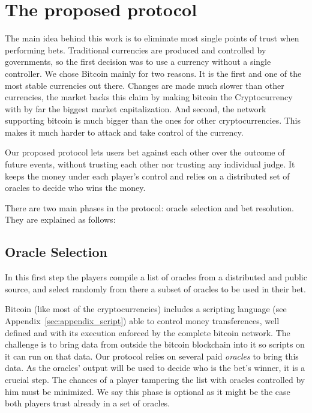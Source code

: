 \section{The proposed protocol}

The main idea behind this work is to eliminate most single points of
  trust when performing bets.
Traditional currencies are produced and controlled by governments, so the first
  decision was to use a currency without a single controller.
We chose Bitcoin mainly for two reasons.
It is the first and one of the most stable currencies out there.
Changes are made much slower than other currencies, the market backs this claim
  by making bitcoin the Cryptocurrency with by far the biggest market
  capitalization.
And second, the network supporting bitcoin is much bigger than the ones for
  other cryptocurrencies. This makes it much harder to attack and take control
  of the currency.

Our proposed protocol lets users bet against each other over the outcome of
  future events, without trusting each other nor trusting any individual judge.
It keeps the money under each player's control and relies on a distributed set
  of oracles to decide who wins the money.

There are two main phases in the protocol: oracle selection and bet
  resolution. They are explained as follows:

\subsection{Oracle Selection}
In this first step the players compile a list of oracles from a distributed
  and public source, and select randomly from there a subset of oracles to
  be used in their bet.

Bitcoin (like most of the cryptocurrencies) includes a scripting language
  (see Appendix~\ref{sec:appendix_script})
able
 to control money transferences, well defined and with its execution enforced by
 the complete bitcoin network.
The challenge is to bring data from outside the bitcoin blockchain into it so
  scripts on it can run on that data.
Our protocol relies on several paid \textit{oracles} to bring this data.
As the oracles' output will be used to decide who is the bet's winner, it is a
  crucial step.
The chances of a player tampering the list with oracles controlled by him must
  be minimized.
We say this phase is optional as it might be the case both players trust already
  in a set of oracles.

